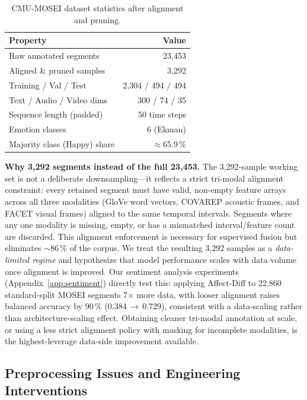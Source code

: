 \documentclass[conference]{IEEEtran}
\begin{document}
\begin{table}[htbp]
\caption{CMU-MOSEI dataset statistics after alignment and pruning.}
\begin{center}
\begin{tabular}{@{}lr@{}}
\toprule
\textbf{Property} & \textbf{Value} \\
\midrule
Raw annotated segments & 23,453 \\
Aligned \& pruned samples & 3,292 \\
Training / Val / Test & 2,304 / 494 / 494 \\
\midrule
Text / Audio / Video dims & 300 / 74 / 35 \\
Sequence length (padded) & 50 time steps \\
Emotion classes & 6 (Ekman) \\
Majority class (Happy) share & $\approx$65.9\,\% \\
\bottomrule
\end{tabular}
\label{tab:dataset_stats}
\end{center}
\end{table}

\textbf{Why 3{,}292 segments instead of the full 23{,}453.}
The 3{,}292-sample working set is not a deliberate downsampling—it reflects a
strict tri-modal alignment constraint: every retained segment must have valid,
non-empty feature arrays across all three modalities (GloVe word vectors,
COVAREP acoustic frames, and FACET visual frames) aligned to the same temporal
intervals.  Segments where any one modality is missing, empty, or has a
mismatched interval/feature count are discarded.  This alignment enforcement is
necessary for supervised fusion but eliminates $\sim$86\,\% of the corpus.
We treat the resulting 3{,}292 samples as a \emph{data-limited regime} and
hypothesize that model performance scales with data volume once alignment is
improved.  Our sentiment analysis experiments (Appendix~\ref{app:sentiment})
directly test this: applying Affect-Diff to 22{,}860 standard-split MOSEI
segments 7$\times$ more data, with looser alignment raises balanced accuracy
by 90\,\% (0.384\,$\to$\,0.729), consistent with a data-scaling rather than
architecture-scaling effect.  Obtaining cleaner tri-modal annotation at scale,
or using a less strict alignment policy with masking for incomplete modalities,
is the highest-leverage data-side improvement available.

\subsection{Preprocessing Issues and Engineering Interventions}
\label{sec:special_issues}
\end{document}
